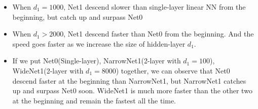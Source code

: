 \begin{itemize}
	\item When $d_1 = 1000$, Net1 descend slower than single-layer linear NN from the beginning, but catch up and surpass Net0
	\item When $d_1 > 2000$, Net1 descend faster than Net0 from the beginning. And the speed goes faster as we increase the size of hidden-layer $d_1$.
	\item If we put Net0(Single-layer), NarrowNet1(2-layer with $d_1 = 100$), WideNet1(2-layer with $d_1 = 8000$) together, we can observe that Net0 descend faster at the beginning than NarrowNet1, but NarrowNet1 catches up and surpass Net0 soon. WideNet1 is much more faster than the other two at the beginning and remain the fastest all the time.
\end{itemize}